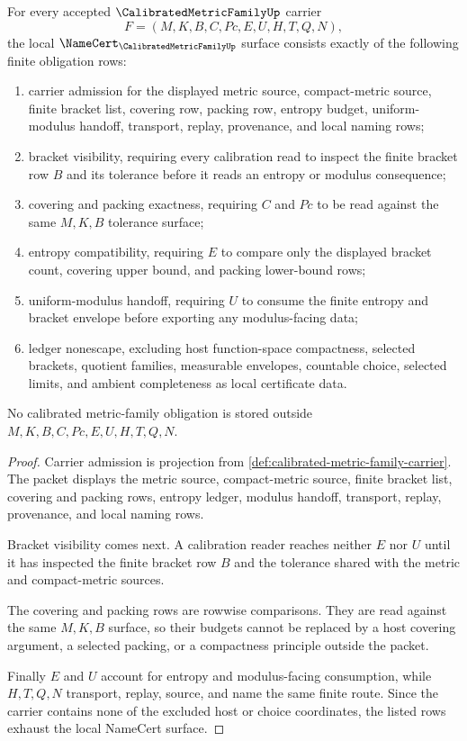 \begin{theorem}
\label{thm:calibrated-metric-family-namecert-obligations}
For every accepted $\CalibratedMetricFamilyUp$ carrier
$$
F=(M,K,B,C,Pc,E,U,H,T,Q,N),
$$
the local $\NameCert_{\CalibratedMetricFamilyUp}$ surface consists exactly of the following finite obligation rows:
\begin{enumerate}
\item carrier admission for the displayed metric source, compact-metric source, finite bracket list, covering row, packing row, entropy budget, uniform-modulus handoff, transport, replay, provenance, and local naming rows;
\item bracket visibility, requiring every calibration read to inspect the finite bracket row $B$ and its tolerance before it reads an entropy or modulus consequence;
\item covering and packing exactness, requiring $C$ and $Pc$ to be read against the same $M,K,B$ tolerance surface;
\item entropy compatibility, requiring $E$ to compare only the displayed bracket count, covering upper bound, and packing lower-bound rows;
\item uniform-modulus handoff, requiring $U$ to consume the finite entropy and bracket envelope before exporting any modulus-facing data;
\item ledger nonescape, excluding host function-space compactness, selected brackets, quotient families, measurable envelopes, countable choice, selected limits, and ambient completeness as local certificate data.
\end{enumerate}
No calibrated metric-family obligation is stored outside $M,K,B,C,Pc,E,U,H,T,Q,N$.
\end{theorem}
\begin{proof}
Carrier admission is projection from \autoref{def:calibrated-metric-family-carrier}. The packet displays the metric source, compact-metric source, finite bracket list, covering and packing rows, entropy ledger, modulus handoff, transport, replay, provenance, and local naming rows.

Bracket visibility comes next. A calibration reader reaches neither $E$ nor $U$ until it has inspected the finite bracket row $B$ and the tolerance shared with the metric and compact-metric sources.

The covering and packing rows are rowwise comparisons. They are read against the same $M,K,B$ surface, so their budgets cannot be replaced by a host covering argument, a selected packing, or a compactness principle outside the packet.

Finally $E$ and $U$ account for entropy and modulus-facing consumption, while $H,T,Q,N$ transport, replay, source, and name the same finite route. Since the carrier contains none of the excluded host or choice coordinates, the listed rows exhaust the local NameCert surface.
\end{proof}

